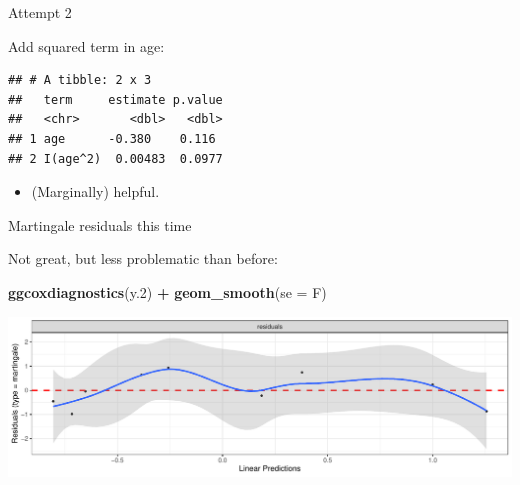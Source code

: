 \documentclass[
  ignorenonframetext,
]{beamer}
\newenvironment{Shaded}{\begin{snugshade}}{\end{snugshade}}
\newcommand{\DataTypeTok}[1]{\textcolor[rgb]{0.13,0.29,0.53}{#1}}
\newcommand{\DecValTok}[1]{\textcolor[rgb]{0.00,0.00,0.81}{#1}}
\newcommand{\FloatTok}[1]{\textcolor[rgb]{0.00,0.00,0.81}{#1}}
\newcommand{\KeywordTok}[1]{\textcolor[rgb]{0.13,0.29,0.53}{\textbf{#1}}}
\newcommand{\NormalTok}[1]{#1}
\newcommand{\OperatorTok}[1]{\textcolor[rgb]{0.81,0.36,0.00}{\textbf{#1}}}
\newcommand{\StringTok}[1]{\textcolor[rgb]{0.31,0.60,0.02}{#1}}
\providecommand{\tightlist}{%
  \setlength{\itemsep}{0pt}\setlength{\parskip}{0pt}}
\begin{document}
\begin{frame}[fragile]{Attempt 2}
\protect\hypertarget{attempt-2}{}

Add squared term in age:

\begin{Shaded}
\end{Shaded}

\begin{verbatim}
## # A tibble: 2 x 3
##   term     estimate p.value
##   <chr>       <dbl>   <dbl>
## 1 age      -0.380    0.116 
## 2 I(age^2)  0.00483  0.0977
\end{verbatim}

\begin{itemize}
\tightlist
\item
  (Marginally) helpful.
\end{itemize}

\end{frame}

\begin{frame}[fragile]{Martingale residuals this time}
\protect\hypertarget{martingale-residuals-this-time}{}

Not great, but less problematic than before:

\begin{Shaded}
\begin{Highlighting}[]
\KeywordTok{ggcoxdiagnostics}\NormalTok{(y}\FloatTok{.2}\NormalTok{) }\OperatorTok{+}\StringTok{ }\KeywordTok{geom_smooth}\NormalTok{(}\DataTypeTok{se =}\NormalTok{ F)}
\end{Highlighting}
\end{Shaded}

\includegraphics{slides_d29_files/figure-beamer/unnamed-chunk-186-1.pdf}

\end{frame}
\end{document}
